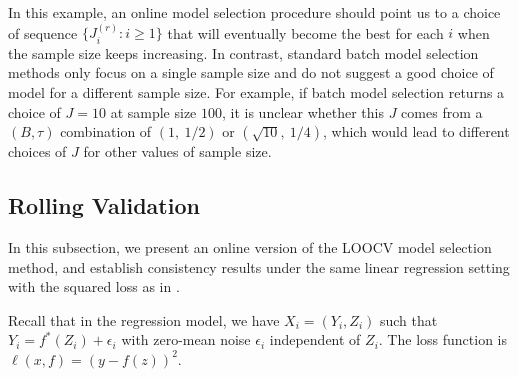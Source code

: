 \documentclass[11pt]{article}
\theoremstyle{plain}
\begin{document}
In this example, an online model selection procedure should point us to a choice of sequence $\{J_i^{(r)}:i\ge 1\}$ that will eventually become the best for each $i$ when the sample size keeps increasing. In contrast, standard batch model selection methods only focus on a single sample size and do not suggest a good choice of model for a different sample size. For example, if batch model selection returns a choice of $J=10$ at 
sample size $100$, it is unclear whether this $J$ comes from a $(B,\tau)$ combination of $(1,~1/2)$ or $(\sqrt{10},~1/4)$, which would lead to different choices of $J$ for other values of sample size.

\subsection{Rolling Validation}\label{subsec:3.3-rv}
In this subsection, we present an online version of the LOOCV model selection method, and establish consistency results under the same linear regression setting with the squared loss as in .

Recall that in the regression model, we have $X_i=(Y_i,Z_i)$ such that $Y_i=f^*(Z_i)+\epsilon_i$ with zero-mean noise $\epsilon_i$ independent of $Z_i$.  The loss function is $\ell(x,f) = (y-f(z))^2$.
\end{document}
